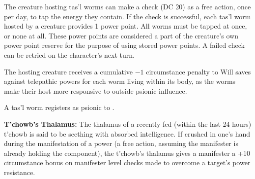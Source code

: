 The creature hosting tas'l worms can make a  check (DC 20) as a free action, once per day, to tap the energy they contain. If the check is successful, each tas'l worm hosted by a creature provides 1 power point. All worms must be tapped at once, or none at all. These power points are considered a part of the creature's own power point reserve for the purpose of using stored power points. A failed check can be retried on the character's next turn.

The hosting creature receives a cumulative $-1$ circumstance penalty to Will saves against telepathic powers for each worm living within its body, as the worms make their host more responsive to outside psionic influence.

A tas'l worm registers as psionic to .

\textbf{T'chowb's Thalamus:} The thalamus of a recently fed (within the last 24 hours) t'chowb is said to be seething with absorbed intelligence. If crushed in one's hand during the manifestation of a power (a free action, assuming the manifester is already holding the component), the t'chowb's thalamus gives a manifester a +10 circumstance bonus on manifester level checks made to overcome a target's power resistance.